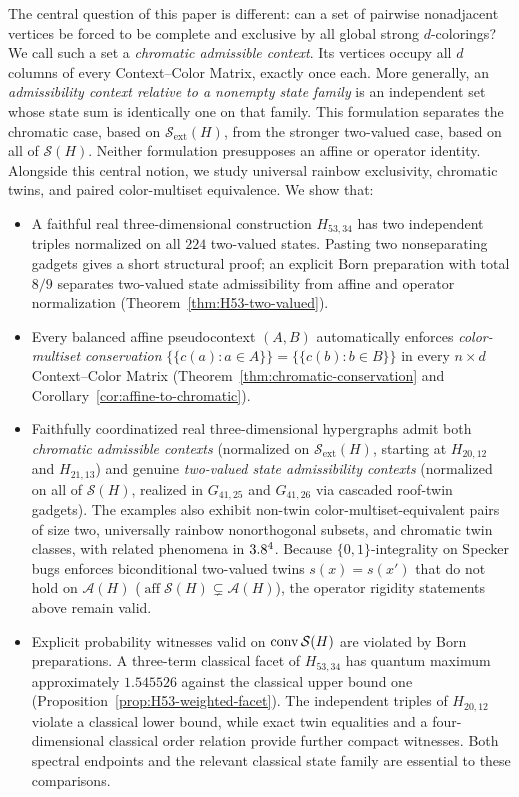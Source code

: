 \documentclass[aps,pra,reprint,superscriptaddress,longbibliography,nofootinbib,floatfix,10pt]{revtex4-2}
\theoremstyle{definition}\newtheorem{definition}[theorem]{Definition}
\theoremstyle{remark}\newtheorem{remark}[theorem]{Remark}
\newcommand{\Sc}{\mathcal S}\newcommand{\Cc}{\mathcal C}\newcommand{\Wc}{\mathcal W}
\begin{document}
The central question of this paper is different: can a set of pairwise nonadjacent vertices be forced to be complete and exclusive by all global strong $d$-colorings? We call such a set a \emph{chromatic admissible context}. Its vertices occupy all $d$ columns of every Context--Color Matrix, exactly once each. More generally, an \emph{admissibility context relative to a nonempty state family} is an independent set whose state sum is identically one on that family. This formulation separates the chromatic case, based on $\Sc_{\mathrm{ext}}(H)$, from the stronger two-valued case, based on all of $\Sc(H)$. Neither formulation presupposes an affine or operator identity. Alongside this central notion, we study universal rainbow exclusivity, chromatic twins, and paired color-multiset equivalence. We show that:
\begin{itemize}
\item A faithful real three-dimensional construction $H_{53,34}$ has two independent triples normalized on all $224$ two-valued states. Pasting two nonseparating gadgets gives a short structural proof; an explicit Born preparation with total $8/9$ separates two-valued state admissibility from affine and operator normalization (Theorem~\ref{thm:H53-two-valued}).
\item Every balanced affine pseudocontext $(A,B)$ automatically enforces \emph{color-multiset conservation} $\{\!\{c(a):a\in A\}\!\}=\{\!\{c(b):b\in B\}\!\}$ in every $n\times d$ Context--Color Matrix (Theorem~\ref{thm:chromatic-conservation} and Corollary~\ref{cor:affine-to-chromatic}).
\item Faithfully coordinatized real three-dimensional hypergraphs admit both \emph{chromatic admissible contexts} (normalized on $\Sc_{\mathrm{ext}}(H)$, starting at $H_{20,12}$ and $H_{21,13}$) and genuine \emph{two-valued state admissibility contexts} (normalized on all of $\Sc(H)$, realized in $G_{41,25}$ and $G_{41,26}$ via cascaded roof-twin gadgets). The examples also exhibit non-twin color-multiset-equivalent pairs of size two, universally rainbow nonorthogonal subsets, and chromatic twin classes, with related phenomena in $3.8^4$. Because $\{0,1\}$-integrality on Specker bugs enforces biconditional two-valued twins $s(x)=s(x')$ that do not hold on $\mathcal A(H)$ ($\operatorname{aff}\Sc(H)\subsetneq\mathcal A(H)$), the operator rigidity statements above remain valid.
\item Explicit probability witnesses valid on $\conv\Sc(H)$ are violated by Born preparations. A three-term classical facet of $H_{53,34}$ has quantum maximum approximately $1.545526$ against the classical upper bound one (Proposition~\ref{prop:H53-weighted-facet}). The independent triples of $H_{20,12}$ violate a classical lower bound, while exact twin equalities and a four-dimensional classical order relation provide further compact witnesses. Both spectral endpoints and the relevant classical state family are essential to these comparisons.
\end{itemize}
\end{document}
